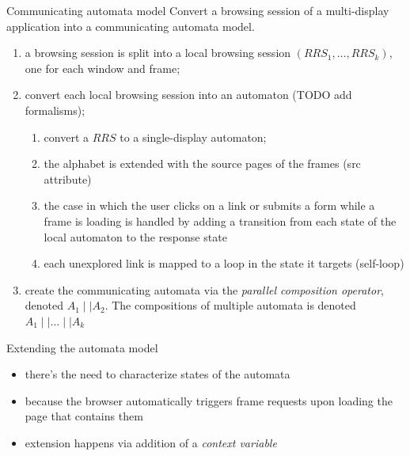 \documentclass[usenames,dvipsnames]{beamer}
\theoremstyle{definition}
\begin{document}
\begin{frame}{Communicating automata model}
  Convert a browsing session of a multi-display application into a communicating automata model.

  \begin{enumerate}
    \item a browsing session is split into a local browsing session $(RRS_1,\dots,RRS_k)$, one for each window and frame;
    \item convert each local browsing session into an automaton (TODO add formalisms);
      \begin{enumerate}
        \item convert a $RRS$ to a single-display automaton;
        \item the alphabet is extended with the source pages of the frames (src attribute)
        \item the case in which the user clicks on a link or submits a form while a frame is loading is handled by adding a transition from each state of the local automaton to the response state
        \item each unexplored link is mapped to a loop in the state it targets (self-loop)
      \end{enumerate}
    \item create the communicating automata via the \textit{parallel composition operator}, denoted $A_1\mid\mid A_2$. The compositions of multiple automata is denoted $A_1\mid\mid\dots\mid\mid A_k$
  \end{enumerate}
\end{frame}

\begin{frame}{Extending the automata model}
  \begin{itemize}
    \item there's the need to characterize states of the automata
    \item because the browser automatically triggers frame requests upon loading the page that contains them
    \item extension happens via addition of a \textit{context variable}
  \end{itemize}
\end{frame}
\end{document}
